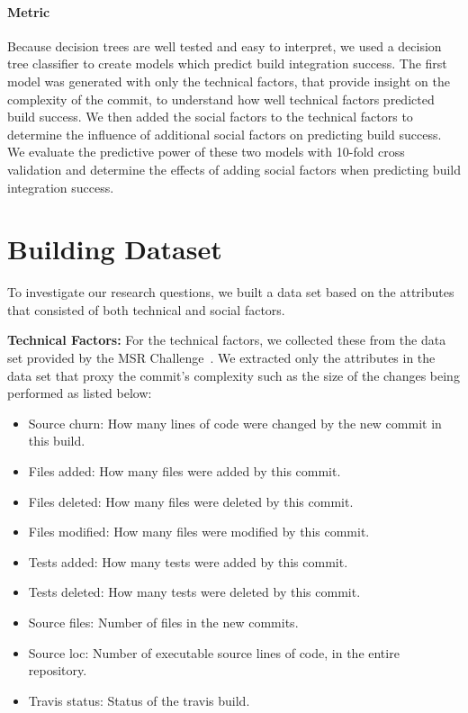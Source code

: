 \documentclass[10pt, conference]{IEEEtran}
\begin{document}
\paragraph{Metric}
Because decision trees are well tested and easy to interpret, we used a decision
tree classifier to create models which predict build integration success. 
The first model was generated with only
the technical factors, that provide insight on the complexity of the commit, 
to understand how well technical factors predicted build
success.  We then added the social factors to the technical factors to determine
the influence of additional social factors on predicting build success.
We evaluate the predictive power of these two 
models with 10-fold cross validation and determine the effects of adding social
factors when predicting build integration success.

\section{Building Dataset}
\label{approach}

To investigate our research questions, we built a data set based on the 
attributes that consisted of both technical and social factors. 

\textbf{Technical Factors:} For the technical factors, we collected
these from the data set provided by the MSR Challenge~\cite{msr17challenge}.
We extracted only the attributes in the data set that proxy the commit's
complexity such as the size of the changes being performed as listed below:\begin{itemize}
\item Source churn: How many lines of code were changed by the new commit in this build.
\item Files added: How many files were added by this commit.
\item Files deleted: How many files were deleted by this commit.
\item Files modified: How many files were modified by this commit.
\item Tests added: How many tests were added by this commit.
\item Tests deleted: How many tests were deleted by this commit.
\item Source files: Number of files in the new commits. 
\item Source loc: Number of executable source lines of code, in the entire repository.
\item Travis status: Status of the travis build.
\end{itemize}
\end{document}
